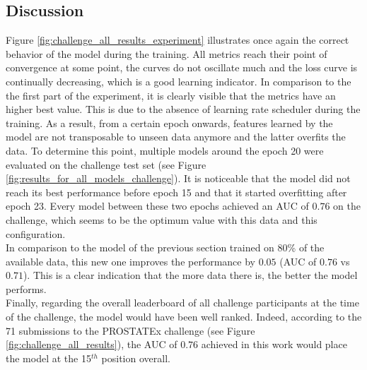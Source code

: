 \subsection{Discussion}
\setlength{\marginparwidth}{3cm}\leavevmode {}Figure \ref{fig:challenge_all_results_experiment} illustrates once again the correct behavior of the model during the training. All metrics reach their point of convergence at some point, the curves do not oscillate much and the loss curve is continually decreasing, which is a good learning indicator. In comparison to the the first part of the experiment, it is clearly visible that the metrics have an higher best value. This is due to the absence of learning rate scheduler during the training. As a result, from a certain epoch onwards, features learned by the model are not transposable to unseen data anymore and the latter overfits the data. To determine this point, multiple models around the epoch 20 were evaluated on the challenge test set (see Figure \ref{fig:results_for_all_models_challenge}). It is noticeable that the model did not reach its best performance before epoch 15 and that it started overfitting after epoch 23. Every model between these two epochs achieved an AUC of $0.76$ on the challenge, which seems to be the optimum value with this data and this configuration.\\
In comparison to the model of the previous section trained on 80\% of the available data, this new one improves the performance by $0.05$ (AUC of $0.76$ vs $0.71$). This is a clear indication that the more data there is, the better the model performs.\\
Finally, regarding the overall leaderboard of all challenge participants at the time of the challenge, the model would have been well ranked. Indeed, according to the 71 submissions to the PROSTATEx challenge (see Figure \ref{fig:challenge_all_results}), the AUC of $0.76$ achieved in this work would place the model at the 15$^{th}$ position overall.
